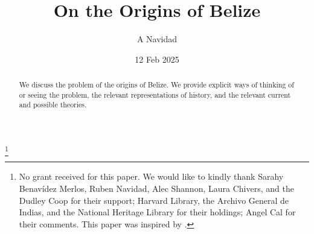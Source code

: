 \documentclass[draft]{amsart}
\theoremstyle{definition}
\theoremstyle{remark}
\begin{document}
%
%
\title{On the Origins of Belize}
\author{A Navidad}
\address{Harvard College, Cambridge, Mass, USA}
\date{12 Feb 2025}
\thanks{No grant received for this paper. We would like to kindly thank Sarahy Benavídez Merlos, Ruben Navidad, Alec Shannon, Laura Chivers, and the Dudley Coop for their support; Harvard Library, the Archivo General de Indias, and the National Heritage Library for their holdings; Angel Cal for their comments. This paper was inspired by .} %
\begin{abstract}
We discuss the problem of the origins of Belize. We provide explicit ways of thinking of or seeing the problem, the relevant representations of history, and the relevant current and possible theories.
\end{abstract}
\maketitle
%
\end{document}
